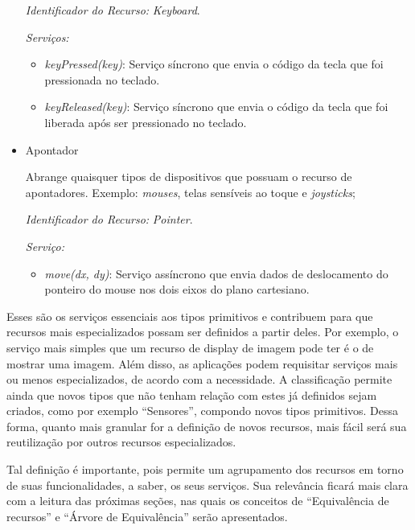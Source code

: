 \begin{itemize}
		\emph{Identificador do Recurso:} \emph{Keyboard}.

		\emph{Serviços:}
		\begin{itemize}
			\item \emph{keyPressed(key)}: Serviço síncrono que envia o código da tecla que foi pressionada no teclado.

			\item \emph{keyReleased(key)}: Serviço síncrono que envia o código da tecla que foi liberada após ser pressionado no teclado.
		\end{itemize}

	\item Apontador
		
		Abrange quaisquer tipos de dispositivos que possuam o recurso de apontadores. Exemplo: \emph{mouses}, telas sensíveis ao toque e \emph{joysticks};

		\emph{Identificador do Recurso:} \emph{Pointer}.

		\emph{Serviço:}
		\begin{itemize}
			\item \emph{move(dx, dy)}: Serviço assíncrono que envia dados de deslocamento do ponteiro do mouse nos dois eixos do plano cartesiano.
		\end{itemize}

\end{itemize}

Esses são os serviços essenciais aos tipos primitivos e contribuem para que recursos mais especializados possam ser definidos a partir deles. Por exemplo, o serviço mais simples que um recurso de display de imagem pode ter é o de mostrar uma imagem. Além disso, as aplicações podem requisitar serviços mais ou menos especializados, de acordo com a necessidade. A classificação permite ainda que novos tipos que não tenham relação com estes já definidos sejam criados, como por exemplo ``Sensores'', compondo novos tipos primitivos. Dessa forma, quanto mais granular for a definição de novos recursos, mais fácil será sua reutilização por outros recursos especializados. 

Tal definição é importante, pois permite um agrupamento dos recursos em torno de suas funcionalidades, a saber, os seus serviços. Sua relevância ficará mais clara com a leitura das próximas seções, nas quais os conceitos de ``Equivalência de recursos'' e ``Árvore de Equivalência'' serão apresentados.




